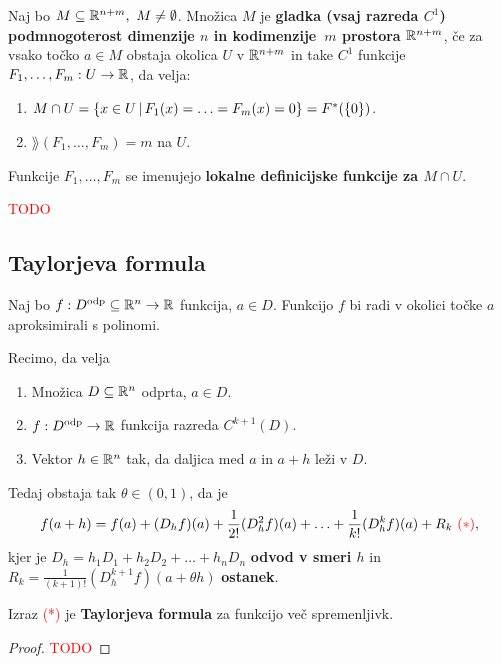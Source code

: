 \begin{definicija}
    Naj bo $M \subseteq \mathbb{R}^{n+m}, \ M \neq \emptyset$. Množica $M$ je \textbf{gladka (vsaj razreda $C^1$) podmnogoterost dimenzije $n$ in kodimenzije~$m$ prostora $\mathbb{R}^{n+m}$}, če 
    za vsako točko $a \in M$ obstaja okolica $U$ v $\mathbb{R}^{n+m}$ in take $C^1$ funkcije $F_1, \ldots, F_m: U \to \mathbb{R}$, da velja:
    \begin{enumerate}
        \item $M \cap U = \left\{x \in U \,|\, F_1(x) = \ldots = F_m(x) = 0\right\} = F^*(\left\{0\right\})$.
        \item $\rang(F_1, \ldots, F_m) = m$ na $U$.
    \end{enumerate}
\end{definicija}

\begin{opomba}
    Funkcije $F_1, \ldots, F_m$ se imenujejo \textbf{lokalne definicijske funkcije za $M \cap U$}.
\end{opomba}

\textcolor{red}{TODO}

\newpage
\subsection{Taylorjeva formula}
Naj bo $f: D^{\text{odp}} \subseteq \mathbb{R}^n \to \mathbb{R}$ funkcija, $a \in D$. Funkcijo $f$ bi radi v okolici točke $a$ aproksimirali s polinomi.

\begin{izrek}
    Recimo, da velja
    \begin{enumerate}
        \item Množica $D \subseteq \mathbb{R}^n$ odprta, $a \in D$.
        \item $f: D^{\text{odp}} \to \mathbb{R}$ funkcija razreda $C^{k+1}(D)$.
        \item Vektor $h \in \mathbb{R}^n$ tak, da daljica med $a$ in $a+h$ leži v $D$.
    \end{enumerate}
    Tedaj obstaja tak $\theta \in (0,1)$, da je 
    $$f(a+h) = f(a) + (D_hf)(a) + \frac{1}{2!}(D_h^2f)(a) + \ldots + \frac{1}{k!} (D_h^kf)(a) + R_k \ \textcolor{red}{(*)},$$
    kjer je $D_h = h_1D_1 + h_2D_2 + \ldots + h_nD_n$ \textbf{odvod v smeri $h$} in $R_k = \frac{1}{(k+1)!} (D_h^{k+1}f)(a + \theta h)$ \textbf{ostanek}.

    Izraz \textcolor{red}{(*)} je \textbf{Taylorjeva formula} za funkcijo več spremenljivk.
\end{izrek}

\begin{proof}
    \textcolor{red}{TODO}
\end{proof}

